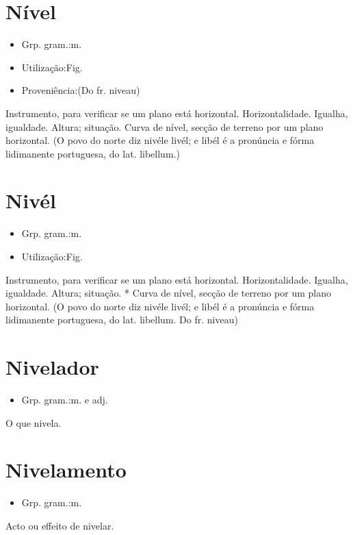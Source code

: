 \section{Nível}
\begin{itemize}
\item {Grp. gram.:m.}
\end{itemize}
\begin{itemize}
\item {Utilização:Fig.}
\end{itemize}
\begin{itemize}
\item {Proveniência:(Do fr. \textunderscore niveau\textunderscore )}
\end{itemize}
Instrumento, para verificar se um plano está horizontal.
Horizontalidade.
Igualha, igualdade.
Altura; situação.
\textunderscore Curva de nível\textunderscore , secção de terreno por um plano horizontal.
(O povo do norte diz \textunderscore nivél\textunderscore  e \textunderscore livél\textunderscore ; e libél é a pronúncia e fórma lidimanente portuguesa, do lat. \textunderscore libellum\textunderscore .)
\section{Nivél}
\begin{itemize}
\item {Grp. gram.:m.}
\end{itemize}
\begin{itemize}
\item {Utilização:Fig.}
\end{itemize}
Instrumento, para verificar se um plano está horizontal.
Horizontalidade.
Igualha, igualdade.
Altura; situação.
* \textunderscore Curva de nível\textunderscore , secção de terreno por um plano horizontal.
(O povo do norte diz \textunderscore nivél\textunderscore  e \textunderscore livél\textunderscore ; e libél é a pronúncia e fórma lidimanente portuguesa, do lat. \textunderscore libellum\textunderscore . Do fr. \textunderscore niveau\textunderscore )
\section{Nivelador}
\begin{itemize}
\item {Grp. gram.:m.  e  adj.}
\end{itemize}
O que nivela.
\section{Nivelamento}
\begin{itemize}
\item {Grp. gram.:m.}
\end{itemize}
Acto ou effeito de nivelar.
